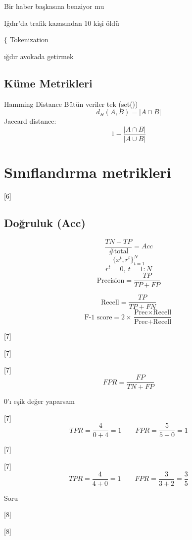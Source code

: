 \documentclass[11pt,a4paper]{article}
\begin{document}
Bir haber başkasına benziyor mu

Iğdır'da trafik kazasından 10 kişi öldü

$\Big\{$ Tokenization

{\color{turuncukalem}}

{\color{turuncukalem}}

ığdır avokada getirmek

\subsection{Küme Metrikleri}
Hamming Distance \quad Bütün veriler tek (set())
\[ d_H(A,B) = |A \cap B| \]
Jaccard distance:
\[ 1 - \frac{|A\cap B|}{|A\cup B|} \]

\section{Sınıflandırma metrikleri}
[6]

\subsection{Doğruluk (Acc)}
\[ \frac{TN+TP}{\#\text{total}} = Acc \]
\[ \{x^t, r^t\}_{t=1}^{N} \]
\[ r^t = 0,\ t=1{:}N \]
\[ \text{Precision} = \frac{TP}{TP+FP} \]

\[ \text{Recell} = \frac{TP}{TP+FN} \]
\[ \text{F-1 score} = 2\times\frac{\text{Prec}\times\text{Recell}}{\text{Prec}+\text{Recell}} \]

[7]

[7]

[7]
\[ FPR = \frac{FP}{TN+FP} \]

0'ı eşik değer yaparsam

[7]
\[ TPR = \frac{4}{0+4} = 1 \qquad FPR = \frac{5}{5+0} = 1 \]

[7]

[7]
\[ TPR = \frac{4}{4+0} = 1 \qquad FPR = \frac{3}{3+2} = \frac{3}{5} \]

Soru

[8]

[8]
\end{document}
